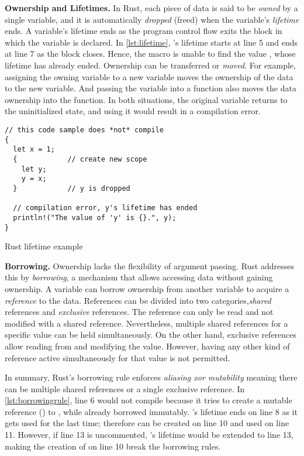 \textbf{Ownership and Lifetimes.}
In Rust, each piece of data is said to be \textit{owned} by a single
variable, and it is automatically \textit{dropped} (freed) when the
variable's \textit{lifetime} ends. A variable's lifetime ends as the program
control flow exits the block in which the variable is declared.
In \autoref{lst:lifetime}, 's lifetime starts at line 5 and ends at
line 7 as the block closes. Hence, the  macro is unable to find
the value , whose lifetime has already ended.
Ownership can be transferred or \textit{moved}. For example,
assigning the owning variable to a new variable moves the ownership of the
data to the new variable. And passing the variable into a function also moves
the data ownership into the function.
In both situations, the original variable returns to the uninitialized state,
and using it would result in a compilation error.

\begin{listing}[hbtp]
    \begin{verbatim}
// this code sample does *not* compile
{
  let x = 1;
  {            // create new scope
    let y;
    y = x;
  }            // y is dropped

  // compilation error, y's lifetime has ended
  println!("The value of 'y' is {}.", y);
}
    \end{verbatim}
    \caption{Rust lifetime example}
    \label{lst:lifetime}
    \vspace{-0.2cm}
\end{listing}

\textbf{Borrowing.}
Ownership lacks the flexibility of argument passing.
Rust addresses this by \textit{borrowing},
a mechanism that allows accessing data without gaining ownership.
A variable can borrow ownership from another variable to acquire a
\textit{reference} to the data. References can be divided into two categories,\textit{shared}
references and \textit{exclusive} references. The reference can only be read
and not modified with a shared reference. Nevertheless, multiple shared
references for a specific value can be held simultaneously.
On the other hand, exclusive references allow reading from and modifying the
value. However, having any other kind of reference active simultaneously for
that value is not permitted.

In summary, Rust's borrowing rule enforces \textit{aliasing xor mutability}
meaning there can be multiple shared references or a single exclusive
reference.
In \autoref{lst:borrowingrule}, line 6 would not compile because it tries to create
a mutable reference () to , while  already borrowed
 immutably. 's lifetime ends on line 8 as it gets used for the
last time; therefore  can be created on line 10 and used on line 11.
However, if line 13 is uncommented, 's lifetime would be extended to
line 13, making the creation of  on line 10 break the borrowing rules.


